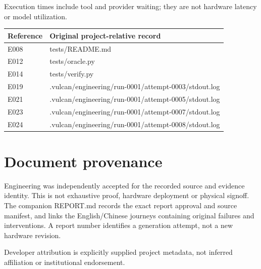 \documentclass[11pt,a4paper]{article}
\begin{document}
Execution times include tool and provider waiting; they are not hardware latency or model utilization.

{\small\renewcommand{\arraystretch}{1.18}\begin{longtable}{@{}L{0.12\textwidth}L{0.82\textwidth}@{}}\toprule

\textbf{Reference} & \textbf{Original project-relative record}\\\midrule\endhead

E008 & tests/\allowbreak{}README.md\\[3pt]

E012 & tests/\allowbreak{}oracle.py\\[3pt]

E014 & tests/\allowbreak{}verify.py\\[3pt]

E019 & .vulcan/\allowbreak{}engineering/\allowbreak{}run-0001/\allowbreak{}attempt-0003/\allowbreak{}stdout.log\\[3pt]

E021 & .vulcan/\allowbreak{}engineering/\allowbreak{}run-0001/\allowbreak{}attempt-0005/\allowbreak{}stdout.log\\[3pt]

E023 & .vulcan/\allowbreak{}engineering/\allowbreak{}run-0001/\allowbreak{}attempt-0007/\allowbreak{}stdout.log\\[3pt]

E024 & .vulcan/\allowbreak{}engineering/\allowbreak{}run-0001/\allowbreak{}attempt-0008/\allowbreak{}stdout.log\\[3pt]

\bottomrule\end{longtable}}

\section{Document provenance}

Engineering was independently accepted for the recorded source and evidence identity. This is not exhaustive proof, hardware deployment or physical signoff. The companion REPORT.md records the exact report approval and source manifest, and links the English/Chinese journeys containing original failures and interventions. A report number identifies a generation attempt, not a new hardware revision.

Developer attribution is explicitly supplied project metadata, not inferred affiliation or institutional endorsement.
\end{document}
